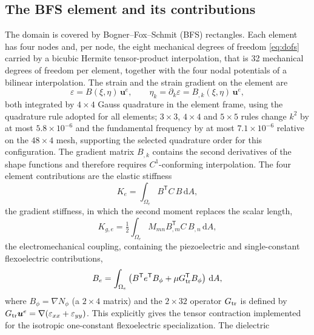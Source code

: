 \FloatBarrier
\subsection{The BFS element and its contributions}
\label{sec:bfs}

The domain is covered by Bogner--Fox--Schmit (BFS) rectangles. Each element has four
nodes and, per node, the eight mechanical degrees of freedom \eqref{eq:dofs}
carried by a bicubic Hermite tensor-product interpolation, that is 32
mechanical degrees of freedom per element, together with the four nodal
potentials of a bilinear interpolation. The strain and the strain gradient on
the element are
\begin{equation}
  \varepsilon = B(\xi,\eta)\,\bm{u}^e,\qquad
  \eta_k = \partial_k\varepsilon = B_{,k}(\xi,\eta)\,\bm{u}^e,
  \label{eq:Bmat}
\end{equation}
both integrated by $4\times4$ Gauss quadrature in the element frame, using the quadrature rule adopted for all elements; $3\times3$, $4\times4$ and
$5\times5$ rules change $k^2$ by at most $5.8\times10^{-6}$ and the fundamental
frequency by at most $7.1\times10^{-6}$ relative on the $48\times4$ mesh, supporting the selected quadrature order for this configuration. The gradient matrix $B_{,k}$ contains the second
derivatives of the shape functions and therefore requires $C^1$-conforming interpolation. The four element contributions are the elastic stiffness
\begin{equation}
  K_e=\int_{\Omega_e} B^{\mathsf T}C\,B\,\mathrm{d}A ,
  \label{eq:Ke}
\end{equation}
the gradient stiffness, in which the second moment replaces the scalar length,
\begin{equation}
  K_{g,e}=\tfrac12\int_{\Omega_e} M_{mn}B_{,m}^{\mathsf T}C\,B_{,n}\,\mathrm{d}A ,
  \label{eq:Kg}
\end{equation}
the electromechanical coupling, containing the piezoelectric and
single-constant flexoelectric contributions,
\begin{equation}
  B_e=\int_{\Omega_e}\left(B^{\mathsf T}e^{\mathsf T}B_\phi
       +\mu G_{\rm tr}^{\mathsf T}B_\phi\right)\,\mathrm{d}A ,
  \label{eq:Be}
\end{equation}
where $B_\phi=\nabla N_\phi$ (a $2\times4$ matrix) and the
$2\times32$ operator $G_{\rm tr}$ is defined by
$G_{\rm tr}\bm u^e=\nabla(\varepsilon_{xx}+\varepsilon_{yy})$.
This explicitly gives the tensor contraction implemented for the
isotropic one-constant flexoelectric specialization. The dielectric
